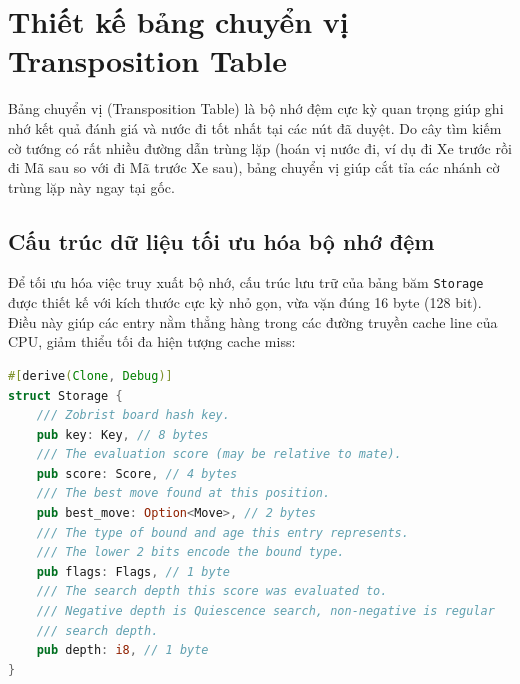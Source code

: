 \section{Thiết kế bảng chuyển vị Transposition Table}

Bảng chuyển vị (Transposition Table) là bộ nhớ đệm cực kỳ quan trọng giúp ghi nhớ kết quả đánh giá và nước đi tốt nhất tại các nút đã duyệt. Do cây tìm kiếm cờ tướng có rất nhiều đường dẫn trùng lặp (hoán vị nước đi, ví dụ đi Xe trước rồi đi Mã sau so với đi Mã trước Xe sau), bảng chuyển vị giúp cắt tỉa các nhánh cờ trùng lặp này ngay tại gốc.

\subsection{Cấu trúc dữ liệu tối ưu hóa bộ nhớ đệm}

Để tối ưu hóa việc truy xuất bộ nhớ, cấu trúc lưu trữ của bảng băm \texttt{Storage} được thiết kế với kích thước cực kỳ nhỏ gọn, vừa vặn đúng 16 byte (128 bit). Điều này giúp các entry nằm thẳng hàng trong các đường truyền cache line của CPU, giảm thiểu tối đa hiện tượng cache miss:

\begin{lstlisting}[language=Rust, caption=Cấu trúc Storage 16-byte của bảng băm TT]
#[derive(Clone, Debug)]
struct Storage {
    /// Zobrist board hash key.
    pub key: Key, // 8 bytes
    /// The evaluation score (may be relative to mate).
    pub score: Score, // 4 bytes
    /// The best move found at this position.
    pub best_move: Option<Move>, // 2 bytes
    /// The type of bound and age this entry represents.
    /// The lower 2 bits encode the bound type.
    pub flags: Flags, // 1 byte
    /// The search depth this score was evaluated to.
    /// Negative depth is Quiescence search, non-negative is regular 
    /// search depth.
    pub depth: i8, // 1 byte
}
\end{lstlisting}

